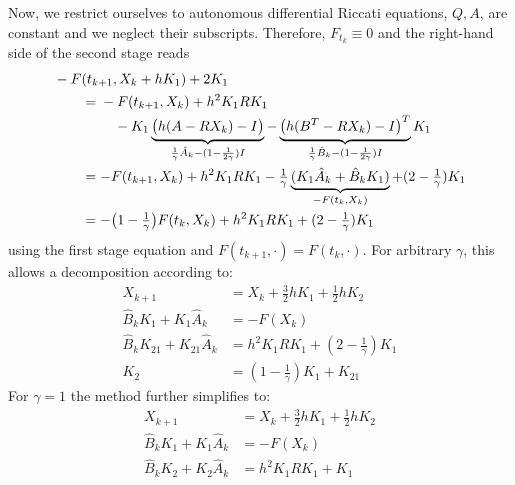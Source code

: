 Now, we restrict ourselves to autonomous differential Riccati equations,
\ie $Q, A$, \etc are constant and we neglect their subscripts.
Therefore, $F_{t_k}\equiv 0$ and the right-hand side of the second stage reads
\begin{subequations}
\begin{align}
  \MoveEqLeft
  -F(t_{k+1}, X_k + hK_1) + 2K_1
  \nonumber \\
  &= \begin{multlined}[t]
    -F(t_{k+1}, X_k) + h^2 K_1 R K_1 \\
    - K_1
    \underbrace{
      \big(h(A - R X_k) - I\big)
    }_{\frac{1}{\gamma} \hat{A}_k - (1-\frac{1}{2\gamma}) I}
    - \underbrace{
      \big(h(B^T - R X_k) - I\big)^T
    }_{\frac{1}{\gamma} \hat{B}_k - (1-\frac{1}{2\gamma}) I}
    K_1
  \end{multlined} \\
  &=
  -F(t_{k+1}, X_k) + h^2 K_1 R K_1
  -\tfrac{1}{\gamma}
  \underbrace{
    (K_1 \hat{A}_k + \hat{B}_k K_1)
  }_{-F(t_k,X_k)}
  + (2-\tfrac{1}{\gamma}) K_1 \\
  &= -\big(1-\tfrac{1}{\gamma}\big) F(t_k, X_k)
  + h^2 K_1 R K_1
  + (2-\tfrac{1}{\gamma}) K_1
\end{align}
\end{subequations}
using the first stage equation and $F(t_{k+1}, \cdot) = F(t_k,\cdot)$.
For arbitrary $\gamma$, this allows a decomposition according to:
\begin{subequations}
\begin{align}
  X_{k+1} &= X_k + \tfrac{3}{2} h K_1 + \tfrac{1}{2} h K_2 \\
  \hat{B}_k K_1 + K_1 \hat{A}_k &= -F(X_k) \\
  \hat{B}_k K_{21} + K_{21} \hat{A}_k &= h^2 K_1RK_1 + (2-\tfrac{1}{\gamma}) K_1 \\
  K_2 &= (1-\tfrac{1}{\gamma}) K_1 + K_{21}
\end{align}
\end{subequations}
For $\gamma=1$ the method further simplifies to:
\begin{subequations}\label{eq:mena:gamma=1}
\begin{align}
  X_{k+1} &= X_k + \tfrac{3}{2} h K_1 + \tfrac{1}{2} h K_2 \\
  \hat{B}_k K_1 + K_1 \hat{A}_k &= -F(X_k) \\
  \hat{B}_k K_2 + K_2 \hat{A}_k &= h^2 K_1RK_1 + K_1
  \label{eq:mena:err:linear}
\end{align}
\end{subequations}

